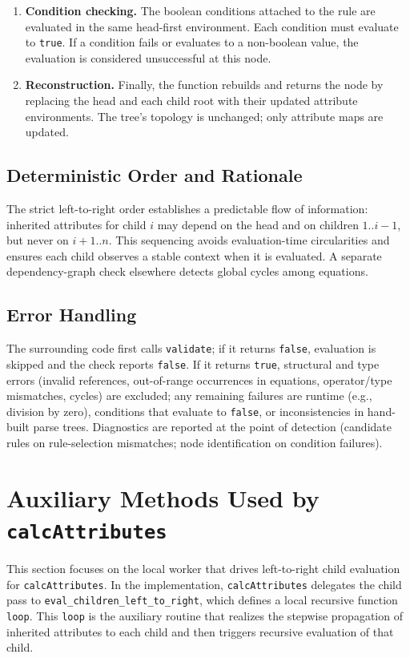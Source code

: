 \begin{enumerate}
  \item \textbf{Condition checking.} The boolean conditions attached to the rule are evaluated in the same head-first environment. Each condition must evaluate 
to \texttt{true}. If a condition fails or evaluates to a non-boolean value, the evaluation is considered unsuccessful at this node. 

  \item \textbf{Reconstruction.} Finally, the function rebuilds and returns the node by replacing the head and each child root with their updated attribute 
environments. The tree's topology is unchanged; only attribute maps are updated. 
\end{enumerate}

\subsection{Deterministic Order and Rationale}
The strict left-to-right order establishes a predictable flow of information: inherited attributes for child \( i \) may depend on the head and on children
\( 1..i-1 \), but never on \( i+1..n \). This sequencing avoids evaluation-time circularities and ensures each child observes a stable context when it is 
evaluated. A separate dependency-graph check elsewhere detects global cycles among equations. 

\subsection{Error Handling}
The surrounding code first calls \texttt{validate}; if it returns \texttt{false}, evaluation is skipped and the check reports \texttt{false}. 
If it returns \texttt{true}, structural and type errors (invalid references, out-of-range occurrences in equations, operator/type mismatches, cycles) are excluded; 
any remaining failures are runtime (e.g., division by zero), conditions that evaluate to \texttt{false}, or inconsistencies in hand-built parse trees. 
Diagnostics are reported at the point of detection (candidate rules on rule-selection mismatches; node identification on condition failures).

\section{Auxiliary Methods Used by \texttt{calcAttributes}}
This section focuses on the local worker that drives left-to-right child evaluation for \texttt{calcAttributes}. In the implementation, \texttt{calcAttributes} 
delegates the child pass to \texttt{eval\_children\_left\_to\_right}, which defines a local recursive function \texttt{loop}. 
This \texttt{loop} is the auxiliary routine that realizes the stepwise propagation of inherited attributes to each child and then triggers 
recursive evaluation of that child. 

